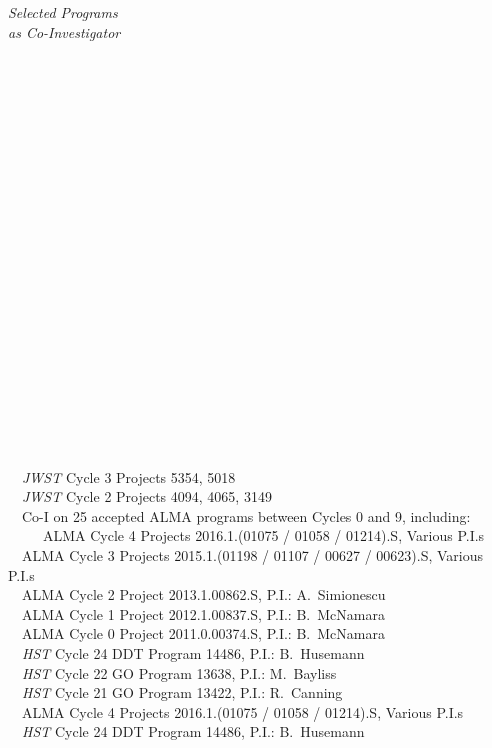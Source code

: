 \documentclass[11pt]{article}
\begin{document}
\vspace{6mm}

\hspace{2.5mm} \parbox{1.5in}{\textit{Selected Programs \\ as Co-Investigator \\\\\\\\\\\\\\\\\\\\\\\\\\\\\\\\\\\\\\\\\\\\}} \parbox{5.15in}{
\textbullet~~\textit{JWST} Cycle 3 Projects 5354, 5018\\
\textbullet~~\textit{JWST} Cycle 2 Projects 4094, 4065, 3149\\
\textbullet~~Co-I on 25 accepted ALMA programs between Cycles 0 and 9, including:\\
~~~\textbullet~~ALMA Cycle 4 Projects 2016.1.(01075 / 01058 / 01214).S, Various P.I.s\\
\indent\textbullet~~ALMA Cycle 3 Projects 2015.1.(01198 / 01107 / 00627 / 00623).S, Various P.I.s\\
\textbullet~~ALMA Cycle 2 Project 2013.1.00862.S, P.I.: A.~Simionescu\\
\textbullet~~ALMA Cycle 1 Project 2012.1.00837.S, P.I.: B.~McNamara\\
\textbullet~~ALMA Cycle 0 Project 2011.0.00374.S, P.I.: B.~McNamara\\
\textbullet~~\textit{HST}  Cycle 24 DDT Program 14486, P.I.: B.~Husemann\\
\textbullet~~\textit{HST}  Cycle 22 GO Program 13638, P.I.: M.~Bayliss\\
\textbullet~~\textit{HST}  Cycle 21 GO Program 13422, P.I.: R.~Canning\\\textbullet~~ALMA Cycle 4 Projects 2016.1.(01075 / 01058 / 01214).S, Various P.I.s\\
\textbullet~~\textit{HST}  Cycle 24 DDT Program 14486, P.I.: B.~Husemann\\
}
\end{document}
